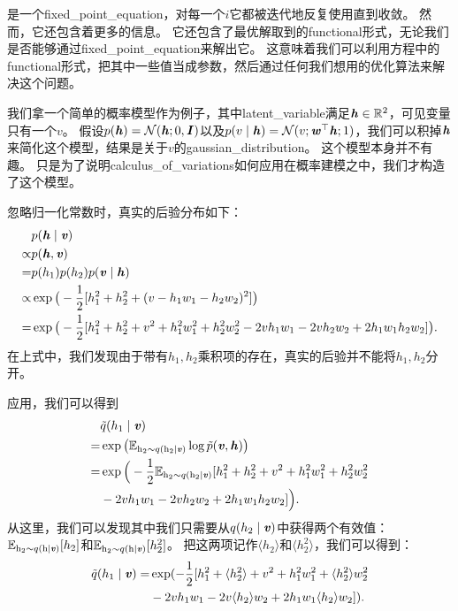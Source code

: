 是一个\gls{fixed_point_equation}，对每一个$i$它都被迭代地反复使用直到收敛。
然而，它还包含着更多的信息。
它还包含了最优解取到的\gls{functional}形式，无论我们是否能够通过\gls{fixed_point_equation}来解出它。
这意味着我们可以利用方程中的\gls{functional}形式，把其中一些值当成参数，然后通过任何我们想用的优化算法来解决这个问题。


我们拿一个简单的概率模型作为例子，其中\gls{latent_variable}满足$\boldsymbol{\mathit{h}}\in\mathbb{R}^2$，可见变量只有一个$v$。
假设$p(\boldsymbol{\mathit{h}}) = \mathcal{N}(\boldsymbol{\mathit{h}};0,\boldsymbol{\mathit{I}})$以及$p(v\mid\boldsymbol{\mathit{h}}) = \mathcal{N}(v;\boldsymbol{\mathit{w}}^{\top}\boldsymbol{\mathit{h}};1)$，我们可以积掉$\boldsymbol{\mathit{h}}$来简化这个模型，结果是关于$v$的\gls{gaussian_distribution}。
这个模型本身并不有趣。
只是为了说明\gls{calculus_of_variations}如何应用在概率建模之中，我们才构造了这个模型。



忽略归一化常数时，真实的后验分布如下：
\begin{align}
	\label{eqn:1957}
   & p(\boldsymbol{\mathit{h}}\mid\boldsymbol{\mathit{v}})\\
 \propto & p(\boldsymbol{\mathit{h}}, \boldsymbol{\mathit{v}})\\
 = & p(h_1) p(h_2) p(\boldsymbol{\mathit{v}}\mid\boldsymbol{\mathit{h}})\\
 \propto & \exp \big(-\frac{1}{2} [h_1^2 + h_2^2 + (v-h_1w_1 - h_2w_2)^2]\big)\\
 = & \exp \big( - \frac{1}{2} [h_1^2 + h_2^2 + v^2 + h_1^2w_1^2 + h_2^2w_2^2 - 2vh_1w_1 - 2vh_2w_2 + 2h_1w_1h_2w_2] \big).
\end{align}
在上式中，我们发现由于带有$h_1,h_2$乘积项的存在，真实的后验并不能将$h_1,h_2$分开。



应用，我们可以得到
\begin{align}
\label{eqn:1962}
& \tilde{q}(h_1\mid\boldsymbol{\mathit{v}})\\ 
= & \exp\big(\mathbb{E}_{\mathrm{h}_2\sim q(\mathrm{h}_2\mid\boldsymbol{\mathit{v}})} \log \tilde{p}(\boldsymbol{\mathit{v}},\boldsymbol{\mathit{h}})\big) \\
= & \exp\Big( -\frac{1}{2} \mathbb{E}_{\mathrm{h}_2\sim q(\mathrm{h}_2\mid\boldsymbol{\mathit{v}})} [h_1^2 + h_2^2 + v^2 + h_1^2w_1^2 + h_2^2w_2^2 \\
& -2vh_1w_1 - 2vh_2w_2 + 2h_1w_1h_2w_2]\Big).
\end{align}
从这里，我们可以发现其中我们只需要从$q(h_2\mid \boldsymbol{\mathit{v}})$中获得两个有效值：
$\mathbb{E}_{\mathrm{h}_2\sim q(\mathrm{h}\mid\boldsymbol{\mathit{v}})}[h_2]$和$\mathbb{E}_{\mathrm{h}_2\sim q(\mathrm{h}\mid\boldsymbol{\mathit{v}})}[h_2^2]$。
把这两项记作$\langle h_2 \rangle$和$\langle h_2^2 \rangle$，我们可以得到：
\begin{align}
\label{eqn:1966}
\tilde{q}(h_1\mid\boldsymbol{\mathit{v}}) = & \exp(-\frac{1}{2} [h_1^2 + \langle h_2^2 \rangle  + v^2 + h_1^2w_1^2 + \langle h_2^2 \rangle w_2^2 
\\ &	-2vh_1w_1 - 2v\langle h_2 \rangle w_2 + 2h_1w_1\langle h_2 \rangle w_2]).	
\end{align}


